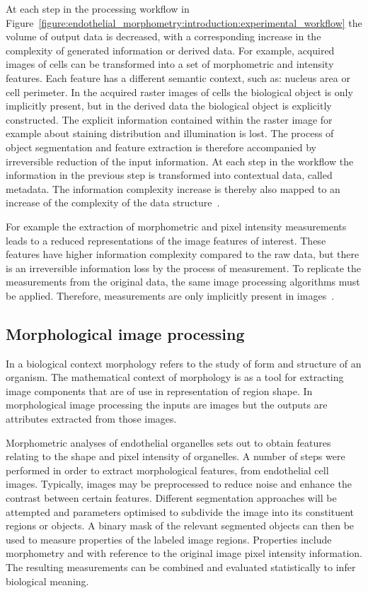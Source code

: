 At each step in the processing workflow in Figure~\ref{figure:endothelial_morphometry:introduction:experimental_workflow} the volume of output data is decreased, with a corresponding increase in the complexity of generated information or derived data. For example, acquired images of cells can be transformed into a set of morphometric and intensity features. Each feature has a different semantic context, such as: nucleus area or cell perimeter. In the acquired raster images of cells the biological object is only implicitly present, but in the derived data the biological object is explicitly constructed. The explicit information contained within the raster image for example about staining distribution and illumination is lost. The process of object segmentation and feature extraction is therefore accompanied by irreversible reduction of the input information. At each step in the workflow the information in the previous step is transformed into contextual data, called metadata. The information complexity increase is thereby also mapped to an increase of the complexity of the data structure~\cite{Prodanov2012}.

For example the extraction of morphometric and pixel intensity measurements leads to a reduced representations of the image features of interest. These features have higher information complexity compared to the raw data, but there is an irreversible information loss by the process of measurement. To replicate the measurements from the original data, the same image processing algorithms must be applied. Therefore, measurements are only implicitly present in images~\cite{Prodanov2012}.

\subsection{Morphological image processing}
In a biological context morphology refers to the study of form and structure of an organism. The mathematical context of morphology is as a tool for extracting image components that are of use in representation of region shape. In morphological image processing the inputs are images but the outputs are attributes extracted from those images.

Morphometric analyses of endothelial organelles sets out to obtain features relating to the shape and pixel intensity of organelles. A number of steps were performed in order to extract morphological features, from endothelial cell images. Typically, images may be preprocessed to reduce noise and enhance the contrast between certain features. Different segmentation approaches will be attempted and parameters optimised to subdivide the image into its constituent regions or objects. A binary mask of the relevant segmented objects can then be used to measure properties of the labeled image regions. Properties include morphometry and with reference to the original image pixel intensity information. The resulting measurements can be combined and evaluated statistically to infer biological meaning.





